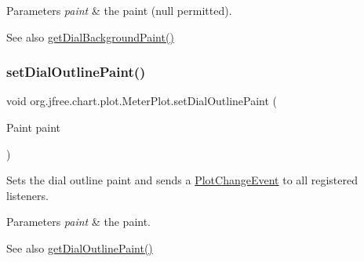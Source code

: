 \begin{DoxyParams}{Parameters}
{\em paint} & the paint ({\ttfamily null} permitted).\\
\hline
\end{DoxyParams}
\begin{DoxySeeAlso}{See also}
\mbox{\hyperlink{classorg_1_1jfree_1_1chart_1_1plot_1_1_meter_plot_aa28a88c359b9a441fdcc8d4f1f0a5ecf}{get\+Dial\+Background\+Paint()}} 
\end{DoxySeeAlso}
\mbox{\label{classorg_1_1jfree_1_1chart_1_1plot_1_1_meter_plot_a3f0b3c240308ac9df18c9cdd5ddd9764}} 
\subsubsection{\texorpdfstring{set\+Dial\+Outline\+Paint()}{setDialOutlinePaint()}}
{\footnotesize\ttfamily void org.\+jfree.\+chart.\+plot.\+Meter\+Plot.\+set\+Dial\+Outline\+Paint (\begin{DoxyParamCaption}\item[{Paint}]{paint }\end{DoxyParamCaption})}

Sets the dial outline paint and sends a \mbox{\hyperlink{}{Plot\+Change\+Event}} to all registered listeners.


\begin{DoxyParams}{Parameters}
{\em paint} & the paint.\\
\hline
\end{DoxyParams}
\begin{DoxySeeAlso}{See also}
\mbox{\hyperlink{classorg_1_1jfree_1_1chart_1_1plot_1_1_meter_plot_a5b42cb9e31e25b2acd71c44dbc420388}{get\+Dial\+Outline\+Paint()}} 
\end{DoxySeeAlso}
\mbox{\label{classorg_1_1jfree_1_1chart_1_1plot_1_1_meter_plot_af91c31df0845c75304bf53fbe33c4487}} 
